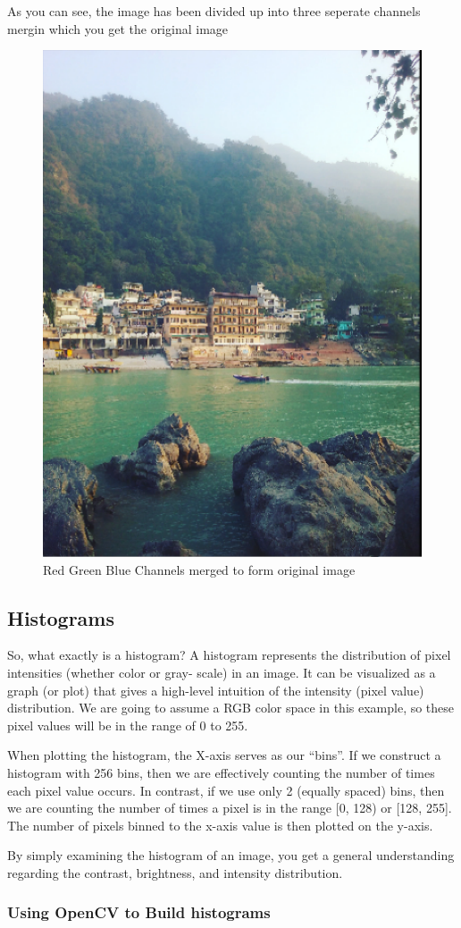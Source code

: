 \documentclass[BTech]{srmuthesis}
\begin{document}
As you can see, the image has been divided up into three seperate channels mergin which you get the original image 

\begin{figure}[!hb]
    \centering
    \includegraphics[width=6cm\textwidth]{og_channel}
    \caption{Red Green Blue Channels merged to form original image}
    \label{fig:Red Green Blue Channels of the same image}
\end{figure}

\subsection{Histograms}

So, what exactly is a histogram? A histogram represents the distribution of pixel intensities (whether color or gray- scale) in an image. It can be visualized as a graph (or plot) that gives a high-level intuition of the intensity (pixel value) distribution. We are going to assume a RGB color space in this example, so these pixel values will be in the range of 0 to 255.

When plotting the histogram, the X-axis serves as our “bins”. If we construct a histogram with 256 bins, then we are effectively counting the number of times each pixel
value occurs. In contrast, if we use only 2 (equally spaced) bins, then we are counting the number of times a pixel is in the range [0, 128) or [128, 255]. The number of pixels binned to the x-axis value is then plotted on the y-axis.

By simply examining the histogram of an image, you get a general understanding regarding the contrast, brightness, and intensity distribution.

\subsubsection{Using OpenCV to Build histograms}
\end{document}
